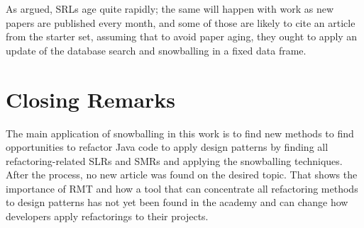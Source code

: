 As argued, SRLs age quite rapidly; the same will happen with work as new papers are published every month, and some of those are likely to cite an article from the starter set, assuming that to avoid paper aging, they ought to apply an update of the database search and snowballing in a fixed data frame.

\section{Closing Remarks}
\label{sec-cloasing-remarks}

The main application of snowballing in this work is to find new methods to find opportunities to refactor Java code to apply design patterns by finding all refactoring-related SLRs and SMRs and applying the snowballing techniques. After the process, no new article was found on the desired topic. That shows the importance of RMT and how a tool that can concentrate all refactoring methods to design patterns has not yet been found in the academy and can change how developers apply refactorings to their projects.